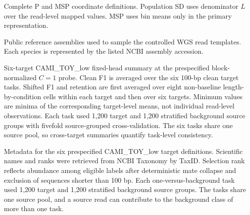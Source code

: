 \documentclass[unnumsec,webpdf,modern,large,numbered]{oup-authoring-template}
\begin{document}
\begin{table}[!tbp]
\centering
\scriptsize
\caption{Complete P and MSP coordinate definitions. Population SD uses denominator $L$ over the read-level mapped values. MSP uses bin means only in the primary representation.}
\label{tab:supps6}
\resizebox{\textwidth}{!}{}
\end{table}

\begin{table}[!tbp]
\centering
\scriptsize
\caption{Public reference assemblies used to sample the controlled WGS read templates. Each species is represented by the listed NCBI assembly accession.}
\label{tab:supps7}

\end{table}

\begin{table}[!tbp]
\centering
\scriptsize
\caption{Six-target CAMI\_TOY\_low fixed-head summary at the prespecified block-normalized $C=1$ probe. Clean F1 is averaged over the six 100-bp clean target tasks. Shifted F1 and retention are first averaged over eight non-baseline length-by-condition cells within each target and then over six targets. Minimum values are minima of the corresponding target-level means, not individual read-level observations. Each task used 1,200 target and 1,200 stratified background source groups with fivefold source-grouped cross-validation. The six tasks share one source pool, so cross-target summaries quantify task-level consistency.}
\label{tab:supps8}
\resizebox{\textwidth}{!}{}
\end{table}

\begin{table}[!tbp]
\centering
\scriptsize
\caption{Metadata for the six prespecified CAMI\_TOY\_low target definitions. Scientific names and ranks were retrieved from NCBI Taxonomy by TaxID. Selection rank reflects abundance among eligible labels after deterministic mate collapse and exclusion of sequences shorter than 100 bp. Each one-versus-background task used 1,200 target and 1,200 stratified background source groups. The tasks share one source pool, and a source read can contribute to the background class of more than one task.}
\label{tab:supps9}
\resizebox{\textwidth}{!}{}
\end{table}
\end{document}
